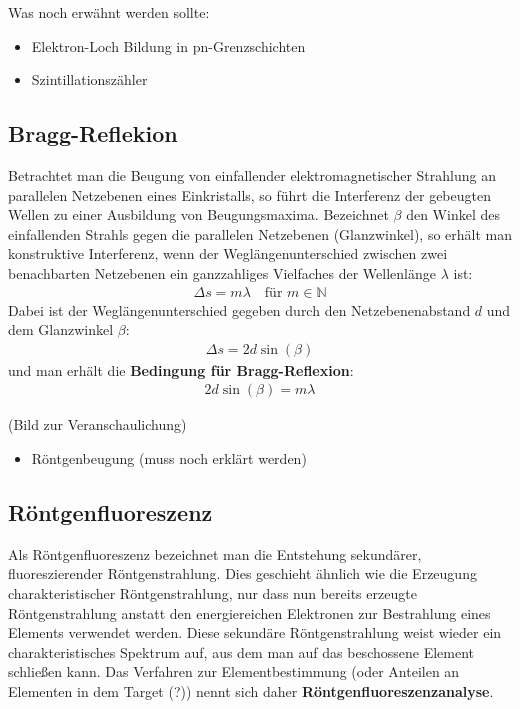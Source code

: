 \documentclass[10pt, a4paper]{article}
\begin{document}
Was noch erwähnt werden sollte:
\begin{itemize}
  \item Elektron-Loch Bildung in pn-Grenzschichten
  \item Szintillationszähler
\end{itemize}

\subsection{Bragg-Reflekion}
Betrachtet man die Beugung von einfallender elektromagnetischer Strahlung an parallelen Netzebenen eines Einkristalls, so führt die Interferenz der gebeugten Wellen zu einer Ausbildung von Beugungsmaxima.
Bezeichnet $\beta$ den Winkel des einfallenden Strahls gegen die parallelen Netzebenen (Glanzwinkel), so erhält man konstruktive Interferenz, wenn der Weglängenunterschied zwischen zwei benachbarten Netzebenen ein ganzzahliges Vielfaches der Wellenlänge $\lambda$ ist:
\begin{align}
  \Delta s = m \lambda \quad \text{für } m \in \mathbb{N}
\end{align}
Dabei ist der Weglängenunterschied gegeben durch den Netzebenenabstand $d$ und dem Glanzwinkel $\beta$:
\begin{align}
  \Delta s = 2 d \sin(\beta)
\end{align}
und man erhält die \textbf{Bedingung für Bragg-Reflexion}:
\begin{align}
  2 d \sin(\beta) = m \lambda
\end{align}

(Bild zur Veranschaulichung)

\begin{itemize}
  \item Röntgenbeugung (muss noch erklärt werden)
\end{itemize}

\subsection{Röntgenfluoreszenz}
Als Röntgenfluoreszenz bezeichnet man die Entstehung sekundärer, fluoreszierender Röntgenstrahlung.
Dies geschieht ähnlich wie die Erzeugung charakteristischer Röntgenstrahlung, nur dass nun bereits erzeugte Röntgenstrahlung anstatt den energiereichen Elektronen zur Bestrahlung eines Elements verwendet werden.
Diese sekundäre Röntgenstrahlung weist wieder ein charakteristisches Spektrum auf, aus dem man auf das beschossene Element schließen kann.
Das Verfahren zur Elementbestimmung (oder Anteilen an Elementen in dem Target (?)) nennt sich daher \textbf{Röntgenfluoreszenzanalyse}.
\end{document}
